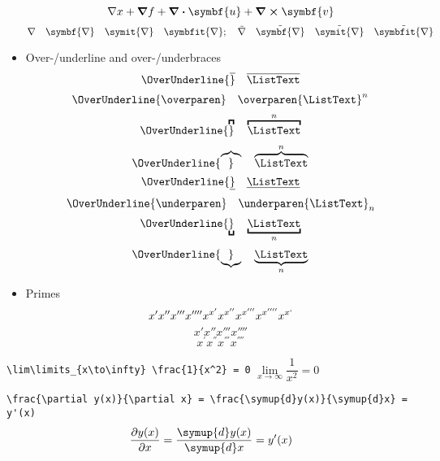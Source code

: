 \documentclass[english,log-declarations=false]{article}
\begin{document}
\begin{itemize}
        \[ \nabla x + \grad{f} + \divergence{\symbf{u}} + \curl{\symbf{v}} \]
        \[
          \nabla                 \quad \symbf{\nabla}           \quad
          \symit{\nabla}         \quad \symbfit{\nabla};        \quad
          \tilde{\nabla}         \quad \tilde{\symbf{\nabla}}   \quad
          \tilde{\symit{\nabla}} \quad \tilde{\symbfit{\nabla}}
        \]
  \item Over-/underline and over-/underbraces
        \[ \OverUnderline{\overline}     \quad \overline     {\ListText}   \]
        \[ \OverUnderline{\overparen}    \quad \overparen    {\ListText}^n \]
        \[ \OverUnderline{\overbracket}  \quad \overbracket  {\ListText}^n \]
        \[ \OverUnderline{\overbrace}    \quad \overbrace    {\ListText}^n \]
        \[ \OverUnderline{\underline}    \quad \underline    {\ListText}   \]
        \[ \OverUnderline{\underparen}   \quad \underparen   {\ListText}_n \]
        \[ \OverUnderline{\underbracket} \quad \underbracket {\ListText}_n \]
        \[ \OverUnderline{\underbrace}   \quad \underbrace   {\ListText}_n \]
  \item Primes
        \[ x' x'' x''' x''''  x^{x'} x^{x''} x^{x'''} x^{x''''} x^{x`} \]
        \[ x \prime x \dprime x \trprime x \qprime \]
        \[ x^{\prime} x^{\dprime} x^{\trprime} x^{\qprime} \] %
\end{itemize}

\verb|\lim\limits_{x\to\infty} \frac{1}{x^2} = 0| $ \lim\limits_{x\to\infty} \dfrac{1}{x^2} = 0 $

\verb|\frac{\partial y(x)}{\partial x} = \frac{\symup{d}y(x)}{\symup{d}x} = y'(x)|
\[ \frac{\partial y(x)}{\partial x} = \frac{\symup{d}y(x)}{\symup{d}x} = y'(x) \]

\printbibliography
\end{document}
